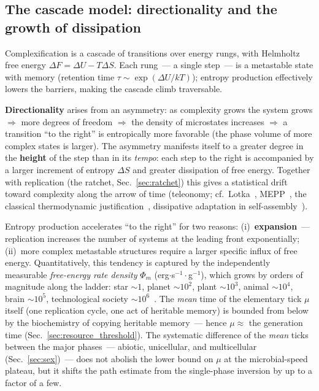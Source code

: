 \documentclass[11pt,a4paper]{article}
\begin{document}
\subsection{The cascade model: directionality and the growth of dissipation}
\label{sec:cascade}

Complexification is a cascade of transitions over energy rungs, with Helmholtz free energy $\Delta F = \Delta U - T\Delta S$. Each rung~--- a single step~--- is a metastable state with memory (retention time $\tau \sim \exp(\Delta U/kT)$); entropy production effectively lowers the barriers, making the cascade climb traversable.

\textbf{Directionality} arises from an asymmetry: as complexity grows the system grows $\Rightarrow$ more degrees of freedom $\Rightarrow$ the density of microstates increases $\Rightarrow$ a transition ``to the right'' is entropically more favorable (the phase volume of more complex states is larger). The asymmetry manifests itself to a greater degree in the \textbf{height} of the step than in its \emph{tempo}: each step to the right is accompanied by a larger increment of entropy $\Delta S$ and greater dissipation of free energy. Together with replication (the ratchet, Sec.~\ref{sec:ratchet}) this gives a statistical drift toward complexity along the arrow of time (teleonomy; cf.~Lotka~\cite{Lotka1922}, MEPP~\cite{Martyushev}, the classical thermodynamic justification~\cite{SchneiderKay1994}, dissipative adaptation in self-assembly~\cite{England2015}).

Entropy production accelerates ``to the right'' for two reasons: (i)~\textbf{expansion}~--- replication increases the number of systems at the leading front exponentially; (ii)~more complex metastable structures require a larger specific influx of free energy. Quantitatively, this tendency is captured by the independently measurable \emph{free-energy rate density} $\Phi_m$ (erg$\cdot$s$^{-1}\cdot$g$^{-1}$), which grows by orders of magnitude along the ladder: star $\sim1$, planet $\sim10^2$, plant $\sim10^3$, animal $\sim10^4$, brain $\sim10^5$, technological society $\sim10^6$~\cite{Chaisson2011}. The \emph{mean} time of the elementary tick $\mu$ itself (one replication cycle, one act of heritable memory) is bounded from below by the biochemistry of copying heritable memory~--- hence $\mu \approx$ the generation time (Sec.~\ref{sec:resource_threshold}). The systematic difference of the \emph{mean} ticks between the major phases~--- abiotic, unicellular, and multicellular (Sec.~\ref{sec:sex})~--- does not abolish the lower bound on $\mu$ at the microbial-speed plateau, but it shifts the path estimate from the single-phase inversion by up to a factor of a few.
\end{document}
